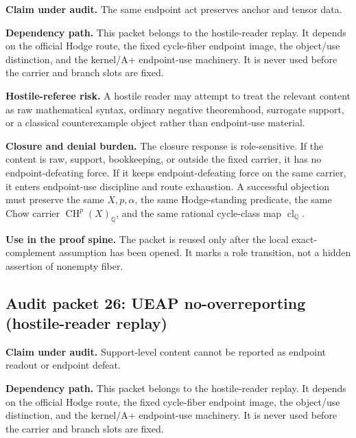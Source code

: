 \documentclass[11pt]{article}
\newcommand{\QQ}{\mathbb{Q}}
\newcommand{\CH}{\operatorname{CH}}
\newcommand{\clQ}{\operatorname{cl}_{\QQ}}
\begin{document}
\par\noindent\textbf{Claim under audit.} The same endpoint act preserves anchor and tensor data.


\par\noindent\textbf{Dependency path.} This packet belongs to the hostile-reader replay. It depends on the official Hodge route, the fixed cycle-fiber endpoint image, the object/use distinction, and the kernel/A+ endpoint-use machinery. It is never used before the carrier and branch slots are fixed.


\par\noindent\textbf{Hostile-referee risk.} A hostile reader may attempt to treat the relevant content as raw mathematical syntax, ordinary negative theoremhood, surrogate support, or a classical counterexample object rather than endpoint-use material.


\par\noindent\textbf{Closure and denial burden.} The closure response is role-sensitive. If the content is raw, support, bookkeeping, or outside the fixed carrier, it has no endpoint-defeating force. If it keeps endpoint-defeating force on the same carrier, it enters endpoint-use discipline and route exhaustion. A successful objection must preserve the same $X,p,\alpha$, the same Hodge-standing predicate, the same Chow carrier $\CH^p(X)_\QQ$, and the same rational cycle-class map $\clQ$.


\par\noindent\textbf{Use in the proof spine.} The packet is reused only after the local exact-complement assumption has been opened. It marks a role transition, not a hidden assertion of nonempty fiber.


\subsection{Audit packet 26: UEAP no-overreporting (hostile-reader replay)}


\par\noindent\textbf{Claim under audit.} Support-level content cannot be reported as endpoint readout or endpoint defeat.


\par\noindent\textbf{Dependency path.} This packet belongs to the hostile-reader replay. It depends on the official Hodge route, the fixed cycle-fiber endpoint image, the object/use distinction, and the kernel/A+ endpoint-use machinery. It is never used before the carrier and branch slots are fixed.
\end{document}
